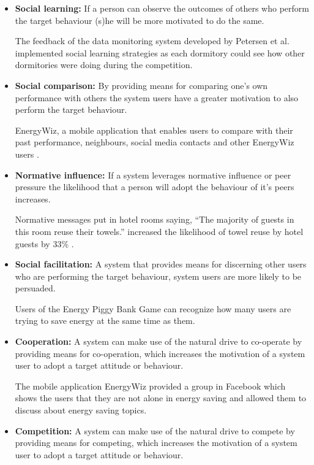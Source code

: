 \begin{itemize}
	\item \textbf{Social learning:}
	If a person can observe the outcomes of others who perform the target behaviour (s)he will be more motivated to do the same.
	
	The feedback of the data monitoring system developed by Petersen et al. \cite{petersen2007dormitory} implemented social learning strategies as each dormitory could see how other dormitories were doing during the competition.
	
	\item \textbf{Social comparison:}
	By providing means for comparing one's own performance with others the system users have a greater motivation to also perform the target behaviour.
	
	EnergyWiz, a mobile application that enables users to compare with their past performance, neighbours, social media contacts and other EnergyWiz users \cite{petkov2011motivating}.
	
	\item \textbf{Normative influence:}
	If a system leverages normative influence or peer pressure the likelihood that a person will adopt the behaviour of it's peers increases.

	Normative messages put in hotel rooms saying, “The majority of guests in this room reuse their towels.” increased the likelihood of towel reuse by hotel guests by 33\% \cite{goldstein2008room}.
	
	\item \textbf{Social facilitation:}
	A system that provides means for discerning other users who are performing the target behaviour, system users are more likely to be persuaded.
		
	Users of the Energy Piggy Bank Game \cite{Bjorn1165339} can	recognize how many users are trying to save energy at the same time as them.
		
	\item \textbf{Cooperation:}
	A system can make use of the natural drive to co-operate by providing means for co-operation, which increases the motivation of a system user to adopt a target attitude or behaviour.
		
	The mobile application EnergyWiz \cite{petkov2011motivating} provided a group in Facebook which shows the users that they are not alone in energy saving and allowed them to discuss about energy saving topics.
	
	\item \textbf{Competition:}
	A system can make use of the natural drive to compete by providing means for competing, which increases the motivation of a system user to adopt a target attitude or behaviour.
	

\end{itemize}
